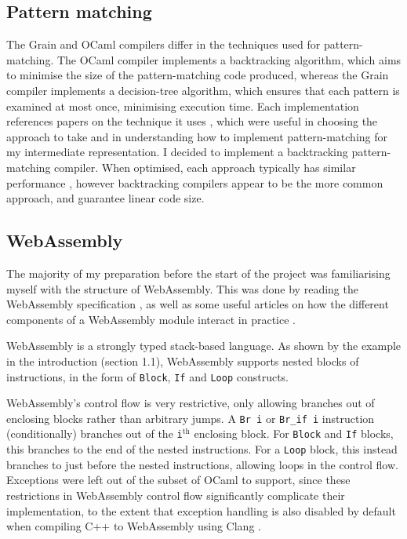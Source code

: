 
\subsection{Pattern matching}

The Grain and OCaml compilers differ in the techniques used for pattern-matching.  The OCaml compiler implements a backtracking algorithm, which aims to minimise the size of the pattern-matching code produced, whereas the Grain compiler implements a decision-tree algorithm, which ensures that each pattern is examined at most once, minimising execution time. Each implementation references papers on the technique it uses \cite{ocamlpatternmatch, decisiontrees}, which were useful in choosing the approach to take and in understanding how to implement pattern-matching for my intermediate representation.
%
I decided to implement a backtracking pattern-matching compiler.  When optimised, each approach typically has similar performance \cite{decisiontrees}, however backtracking compilers appear to be the more common approach, and guarantee linear code size.


\subsection{WebAssembly}
The majority of my preparation before the start of the project was familiarising myself with the structure of WebAssembly.
This was done by reading the WebAssembly specification \cite{wasm}, as well as some useful articles on how the different components of a WebAssembly module interact in practice \cite{wasm-article}.

WebAssembly is a strongly typed stack-based language. %
As shown by the example in the introduction (section 1.1), WebAssembly supports nested blocks of instructions, in the form of \verb|Block|, \verb|If| and \verb|Loop| constructs. 

WebAssembly's control flow is very restrictive, only allowing branches out of enclosing blocks rather than arbitrary jumps. A \verb|Br i| or \verb|Br_if i| instruction (conditionally) branches out of the \verb|i|$^{\text{th}}$ enclosing block. For \verb|Block| and \verb|If| blocks, this branches to the end of the nested instructions. For a \verb|Loop| block, this instead branches to just before the nested instructions, allowing loops in the control flow. %
Exceptions were left out of the subset of OCaml to support, since these restrictions in WebAssembly control flow significantly complicate their implementation, to the extent that exception handling is also disabled by default when compiling C++ to WebAssembly using Clang \cite{wasm-exceptions}.

